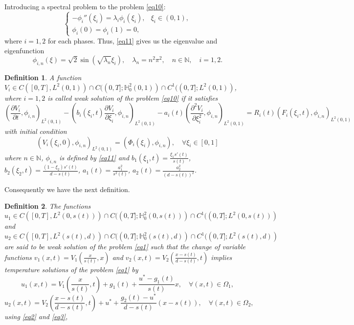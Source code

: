 \documentclass[preprint,12pt,authoryear]{elsarticle}
\newtheorem{definition}{Definition}
\begin{document}
Introducing a spectral problem to the problem \eqref{eq10}:
\begin{equation}\label{eq11}
    \begin{cases}
        -\phi_i''(\xi_i)=\lambda_i\phi_i(\xi_i),&\xi_i\in(0,1),\\
        \phi_i(0)=\phi_i(1)=0,
    \end{cases}
\end{equation}
where $i=1,2$ for each phases. Thus, \eqref{eq11} gives us the eigenvalue and eigenfunction
\begin{equation}\label{eq12}
    \phi_{i,n}(\xi)=\sqrt{2}\sin\left(\sqrt{\lambda_{n}}\xi_i\right),\quad \lambda_{n}=n^2\pi^2,\quad n\in\mathbb{N},\quad i=1,2.
\end{equation}
\begin{definition}
A function $V_i\in C([0,T],L^2(0,1))\cap C((0,T];\mathbb{H}_0^2(0,1))\cap C^1((0,T];L^2(0,1))$, where $i=1,2$ is called weak solution of the problem \eqref{eq10} if it satisfies
\begin{equation}\label{eq13}
    \left(\dfrac{\partial V_i}{\partial t},\phi_{i,n}\right)_{L^2(0,1)}-\left(b_i(\xi_i,t)\dfrac{\partial V_i}{\partial \xi_i},\phi_{i,n}\right)_{L^2(0,1)}-a_i(t)\left(\dfrac{\partial^2 V_i}{\partial\xi_i^2},\phi_{i,n}\right)_{L^2(0,1)}=R_i(t)\left(F_i(\xi_i,t),\phi_{i,n}\right)_{L^2(0,1)}
\end{equation}
with initial condition
\begin{equation}\label{eq14}
    \left(V_i(\xi_i,0),\phi_{i,n}\right)_{L^2(0,1)}=\left(\Phi_i(\xi_i),\phi_{i,n}\right),\quad \forall\xi_i\in[0,1]
\end{equation}
where $n\in\mathbb{N}$, $\phi_{i,n}$ is defined by \eqref{eq11} and $b_1(\xi_1,t)=\frac{\xi_1s'(t)}{s(t)}$, $b_2(\xi_2,t)=\frac{(1-\xi_2)s'(t)}{d-s(t)}$, $a_1(t)=\frac{a_1^2}{s^2(t)}$, $a_2(t)=\frac{a_2^2}{(d-s(t))^2}$. 
\end{definition}

Consequently we have the next definition.
\begin{definition}
    The functions $u_1\in C([0,T],L^2(0,s(t)))\cap C((0,T];\mathbb{H}_0^2(0,s(t)))\cap C^1((0,T];L^2(0,s(t)))$ and $u_2\in C([0,T],L^2(s(t),d))\cap C((0,T];\mathbb{H}_0^2(s(t),d))\cap C^1((0,T];L^2(s(t),d))$  are said to be weak solution of the problem \eqref{eq1} such that the change of variable functions $v_1\left(x,t\right)=V_1\left(\frac{x}{s(t)},x\right)$ and $v_2\left(x,t\right)=V_2\left(\frac{x-s(t)}{d-s(t)},t\right)$ implies temperature solutions of the problem \eqref{eq1} by
$$u_1(x,t)=V_1\left(\frac{x}{s(t)},t\right)+g_1(t)+\dfrac{u^*-g_1(t)}{s(t)}x,\quad \forall(x,t)\in\Omega_1,$$
$$u_2(x,t)=V_2\left(\frac{x-s(t)}{d-s(t)},t\right)+u^*+\dfrac{g_2(t)-u^*}{d-s(t)}(x-s(t)),\quad \forall(x,t)\in\Omega_2,$$
using \eqref{eq2} and \eqref{eq3}, 
\end{definition}
\end{document}
